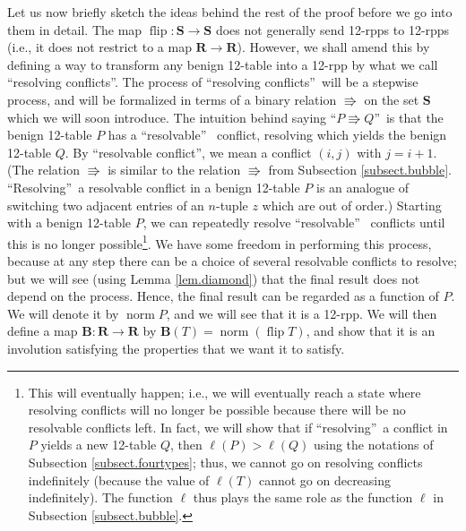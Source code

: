 \documentclass[numbers=enddot,12pt,final,onecolumn,notitlepage]{scrartcl}%
\theoremstyle{definition}
\begin{document}
Let us now briefly sketch the ideas behind the rest of the proof before we go
into them in detail. The map $\operatorname*{flip}:\mathbf{S}\rightarrow
\mathbf{S}$ does not generally send 12-rpps to 12-rpps (i.e., it does not
restrict to a map $\mathbf{R}\rightarrow\mathbf{R}$). However, we shall amend
this by defining a way to transform any benign 12-table into a 12-rpp by what
we call \textquotedblleft resolving conflicts\textquotedblright. The process
of \textquotedblleft resolving conflicts\textquotedblright\ will be a stepwise
process, and will be formalized in terms of a binary relation $\Rrightarrow$
on the set $\mathbf{S}$ which we will soon introduce. The intuition behind
saying \textquotedblleft$P\Rrightarrow Q$\textquotedblright\ is that the
benign 12-table $P$ has a \textquotedblleft resolvable\textquotedblright%
\ conflict, resolving which yields the benign 12-table $Q$. By
\textquotedblleft resolvable conflict\textquotedblright, we mean a conflict
$\left(  i,j\right)  $ with $j=i+1$. (The relation $\Rrightarrow$ is similar
to the relation $\Rrightarrow$ from Subsection \ref{subsect.bubble}.
\textquotedblleft Resolving\textquotedblright\ a resolvable conflict in a
benign 12-table $P$ is an analogue of switching two adjacent entries of an
$n$-tuple $z$ which are out of order.) Starting with a benign 12-table $P$, we
can repeatedly resolve \textquotedblleft resolvable\textquotedblright%
\ conflicts until this is no longer possible\footnote{This will eventually
happen; i.e., we will eventually reach a state where resolving conflicts will
no longer be possible because there will be no resolvable conflicts left. In
fact, we will show that if \textquotedblleft resolving\textquotedblright\ a
conflict in $P$ yields a new 12-table $Q$, then $\ell\left(  P\right)
>\ell\left(  Q\right)  $ using the notations of Subsection
\ref{subsect.fourtypes}; thus, we cannot go on resolving conflicts
indefinitely (because the value of $\ell\left(  T\right)  $ cannot go on
decreasing indefinitely). The function $\ell$ thus plays the same role as the
function $\ell$ in Subsection \ref{subsect.bubble}.}. We have some freedom in
performing this process, because at any step there can be a choice of several
resolvable conflicts to resolve; but we will see (using Lemma
\ref{lem.diamond}) that the final result does not depend on the process.
Hence, the final result can be regarded as a function of $P$. We will denote
it by $\operatorname*{norm}P$, and we will see that it is a 12-rpp. We will
then define a map $\mathbf{B}:\mathbf{R}\rightarrow\mathbf{R}$ by
$\mathbf{B}\left(  T\right)  =\operatorname*{norm}\left(  \operatorname*{flip}%
T\right)  $, and show that it is an involution satisfying the properties that
we want it to satisfy.
\end{document}
